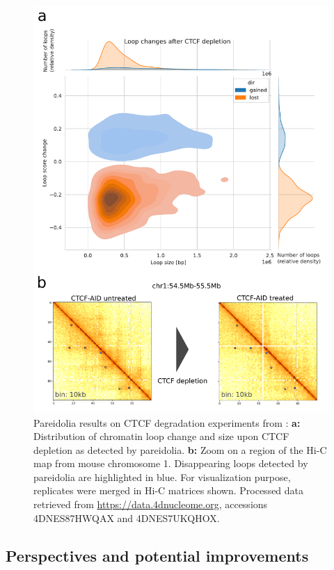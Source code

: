 \begin{figure}[htb]
    \includegraphics[width=\textwidth]{Parts/Part02/gfx/pareidolia/ctcf_depletion_scores_genome.pdf}
    \caption[Pareidolia results on CTCF degradation experiments.]{Pareidolia results on CTCF degradation experiments from \cite{noraTargetedDegradationCTCF2017}: \textbf{a:} Distribution of chromatin loop change and size upon CTCF depletion as detected by pareidolia. \textbf{b:} Zoom on a region of the Hi-C map from mouse chromosome 1. Disappearing loops detected by pareidolia are highlighted in blue. For visualization purpose, replicates were merged in Hi-C matrices shown. Processed data retrieved from \url{https://data.4dnucleome.org}, accessions 4DNES87HWQAX and 4DNES7UKQHOX.}
    \label{fig:02-01:pareidolia-experimental}
\end{figure}

\subsection{Perspectives and potential improvements}

